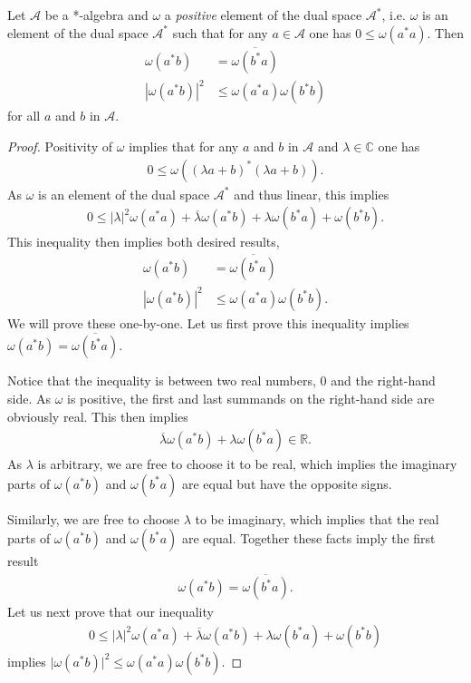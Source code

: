 \begin{lemma}
    \label{lmm:cauchy-schwarz-inequality}
    \leanok
    Let $\mathcal{A}$ be a *-algebra and $\omega$ a \textit{positive} element of the dual space $\mathcal{A}^*$, i.e. $\omega$ is an element of the dual space $\mathcal{A}^*$ such that for any $a \in \mathcal{A}$ one has $0 \le \omega(a^*a)$. Then
    \begin{align}
        \omega(a^*b) &= \overline{\omega(b^*a)} \\
        |\omega(a^*b)|^2 &\le \omega(a^*a) \omega(b^*b)
    \end{align}
    for all $a$ and $b$ in $\mathcal{A}$.
\end{lemma}
\begin{proof}
\leanok
Positivity of $\omega$ implies that for any $a$ and $b$ in $\mathcal{A}$ and $\lambda \in \mathbb{C}$ one has
\begin{align}
    0 \le \omega\left((\lambda a + b)^*(\lambda a + b)\right).
\end{align}
As $\omega$ is an element of the dual space $\mathcal{A}^*$ and thus linear, this implies
\begin{align}
    0 \le |\lambda|^2\omega(a^*a) + \overline{\lambda}\omega(a^*b) + \lambda\omega(b^*a) + \omega(b^*b).
\end{align}
This inequality then implies both desired results,
\begin{align}
    \omega(a^*b) &= \overline{\omega(b^*a)} \\
    |\omega(a^*b)|^2 &\le \omega(a^*a) \omega(b^*b).
\end{align}
We will prove these one-by-one. Let us first prove this inequality implies $\omega(a^*b) = \overline{\omega(b^*a)}$.

Notice that the inequality is between two real numbers, $0$ and the right-hand side. As $\omega$ is positive, the first and last summands on the right-hand side are obviously real. This then implies
\begin{align}
    \overline{\lambda}\omega(a^*b) + \lambda\omega(b^*a) \in \mathbb{R}.
\end{align}
As $\lambda$ is arbitrary, we are free to choose it to be real, which implies the imaginary parts of $\omega(a^*b)$ and $\omega(b^*a)$ are equal but have the opposite signs.

Similarly, we are free to choose $\lambda$ to be imaginary, which implies that the real parts of $\omega(a^*b)$ and $\omega(b^*a)$ are equal. Together these facts imply the first result
\begin{align}
    \omega(a^*b) = \overline{\omega(b^*a)}.
\end{align}
Let us next prove that our inequality
\begin{align}
    0 \le |\lambda|^2\omega(a^*a) + \overline{\lambda}\omega(a^*b) + \lambda\omega(b^*a) + \omega(b^*b)
\end{align}
implies $\lvert \omega(a^*b) \rvert^2 \le \omega(a^*a) \omega(b^*b)$.


\end{proof}
